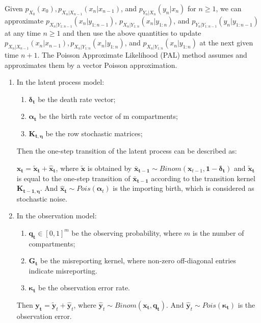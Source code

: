 \documentclass[10pt]{article}
\begin{document}
\vspace{4mm}
Given $p_{X_0}(x_0), p_{X_n|X_{n-1}}(x_n|x_{n-1})$, and $p_{Y_n|X_{n}}(y_n|x_{n})$ for $n\geq1$, we can approximate $p_{X_n|Y_{1:n-1}}(x_n|y_{1:n-1})$, $p_{X_n|Y_{1:n}}(x_n|y_{1:n})$, and $p_{Y_n|Y_{1:n-1}}(y_n|y_{1:n-1})$ at any time $n\geq1$ and then use the above quantities to update $p_{X_n|X_{n-1}}(x_n|x_{n-1}), p_{X_n|Y_{1:n}}(x_n|y_{1:n})$, and $p_{X_n|Y_{1:n}}(x_n|y_{1:n})$ at the next given time $n+1$. The Poisson Approximate Likelihood (PAL) method assumes and approximates them by a vector Poisson approximation. 

\newpage
\begin{enumerate}
    \item 
In the latent process model: 
\vspace{-2mm}
\begin{enumerate}
    \item $\bm{\delta_t}$ be the death rate vector;
    \item $\bm{\alpha_t}$ be the birth rate vector of m compartments;
    \item $\bm{K_{t, \eta}}$ be the row stochastic matrices;
\end{enumerate}
\vspace{-2mm}
Then the one-step transition of the latent process can be described as:

$\bm{x_t} = \bm{\tilde{x}_t} + \bm{\hat{x}_t}$, where $\bm{\tilde{x}}$ is obtained by $\bm{\bar{x}_{t-1}} \sim Binom(\bm{x}_{t-1}, \bm{1- \delta_t})$ and $\bm{\tilde{x}_t}$ is equal to the one-step transition of $\bm{\bar{x}_{t-1}}$ according to the transition kernel $\bm{K_{t-1, \eta}}$. And $\bm{\hat{x}_t} \sim Pois(\bm{\alpha}_t)$ is the importing birth, which is considered as stochastic noise. 
\vspace{-3mm}
\item In the observation model:
\vspace{-2mm}
    \begin{enumerate}
        \item $\bm{q_t}\in [0,1]^m$ be the observing probability, where $m$ is the number of compartments;
        \item $\bm{G_t}$ be the misreporting kernel, where non-zero off-diagonal entries indicate misreporting. 
        \item $\bm{\kappa_t}$ be the observation error rate.
    \end{enumerate}
\vspace{-2mm}
    Then $\bm{y_t} = \bm{\tilde{y}}_t + \bm{\hat{y}}_t$, where $\bm{\hat{y}}_t \sim Binom(\bm{x_t}, \bm{q_t})$. And $\bm{\hat{y}}_t \sim Pois(\bm{\kappa_t})$ is the observation error.
    
\end{enumerate}
\end{document}

